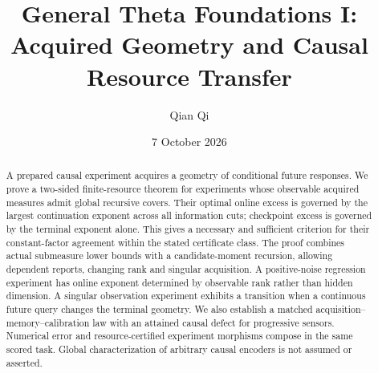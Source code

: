 \documentclass[11pt]{amsart}
\title{General Theta Foundations I:\\Acquired Geometry and Causal Resource Transfer}
\author{Qian Qi}
\date{7 October 2026}
\theoremstyle{definition}
\theoremstyle{remark}
\begin{document}
\begin{abstract}
A prepared causal experiment acquires a geometry of conditional future responses. We prove a two-sided finite-resource theorem for experiments whose observable acquired measures admit global recursive covers. Their optimal online excess is governed by the largest continuation exponent across all information cuts; checkpoint excess is governed by the terminal exponent alone. This gives a necessary and sufficient criterion for their constant-factor agreement within the stated certificate class. The proof combines actual submeasure lower bounds with a candidate-moment recursion, allowing dependent reports, changing rank and singular acquisition. A positive-noise regression experiment has online exponent determined by observable rank rather than hidden dimension. A singular observation experiment exhibits a transition when a continuous future query changes the terminal geometry. We also establish a matched acquisition--memory--calibration law with an attained causal defect for progressive sensors. Numerical error and resource-certified experiment morphisms compose in the same scored task. Global characterization of arbitrary causal encoders is not assumed or asserted.
\end{abstract}
\maketitle










\appendix


\end{document}
